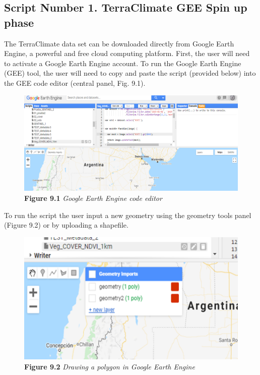 \documentclass[
  10pt,
  b5paper,
]{book}
\begin{document}
\hypertarget{script-number-1.-terraclimate-gee-spin-up-phase}{%
\subsection{Script Number 1. TerraClimate GEE Spin up phase}\label{script-number-1.-terraclimate-gee-spin-up-phase}}

The TerraClimate data set can be downloaded directly from Google Earth Engine, a powerful and free cloud computing platform.
First, the user will need to activate a Google Earth Engine account. To run the Google Earth Engine (GEE) tool, the user will need to copy and paste the script (provided below) into the GEE code editor (central panel, Fig. 9.1).

\begin{figure}
\centering
\includegraphics{images/Figure_9.1.png}
\caption{\textbf{Figure 9.1} \emph{Google Earth Engine code editor}}
\end{figure}

To run the script the user input a new geometry using the geometry tools panel (Figure 9.2) or by uploading a shapefile.

\begin{figure}
\centering
\includegraphics{images/Figure_9.2.png}
\caption{\textbf{Figure 9.2} \emph{Drawing a polygon in Google Earth Engine}}
\end{figure}
\end{document}
